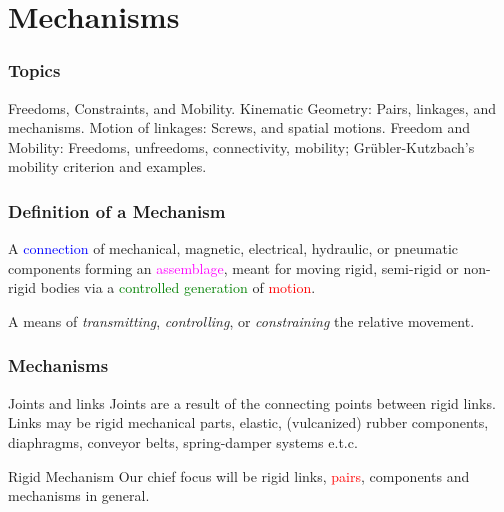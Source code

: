 \section{Mechanisms}

\begin{frame}
	\frametitle{Topics}
	\begin{tcolorbox}[coltitle=yellow!50!black,colframe=magenta!25,split=.2,title=Mechanism Components]
		Freedoms, Constraints, and Mobility.
		\tcblower
		 Kinematic Geometry: Pairs, linkages, and mechanisms.
		 \vspace{.2cm}
		\newline
		Motion of linkages: Screws, and spatial motions.
		\vspace{.2cm}
		\newline
		Freedom and Mobility: Freedoms, unfreedoms, connectivity, mobility;
		\vspace{.2cm}
		\newline
		Gr{\"u}bler-Kutzbach's mobility criterion and examples.
	\end{tcolorbox}
\end{frame}
 
\begin{frame}
	\frametitle{Definition of a Mechanism}
		\begin{definition}
			A \textcolor{blue}{connection} of  mechanical, magnetic, electrical, hydraulic, or pneumatic components forming an \textcolor{magenta}{assemblage}, meant for moving rigid, semi-rigid or non-rigid bodies via a \textcolor{green}{controlled generation} of \textcolor{red}{motion}.
		\end{definition}
	\begin{tcolorbox}[coltitle=red!80!black,colframe=magenta!25,title=Kenneth Hunt (1978)]
			A means of \textit{transmitting}, \textit{controlling}, or \textit{constraining} the relative movement.
	\end{tcolorbox}
\end{frame}

\begin{frame}
	\frametitle{Mechanisms}
	\begin{block}{Joints and links}
		Joints are a result of the connecting points between rigid links.
		Links may be rigid mechanical parts, elastic, (vulcanized) rubber components, diaphragms, conveyor belts, spring-damper systems e.t.c.
	\end{block}
	\begin{block}{Rigid Mechanism}
		Our chief focus will be rigid links, \textcolor{red}{pairs}, components and mechanisms in general.
	\end{block}
\end{frame}



